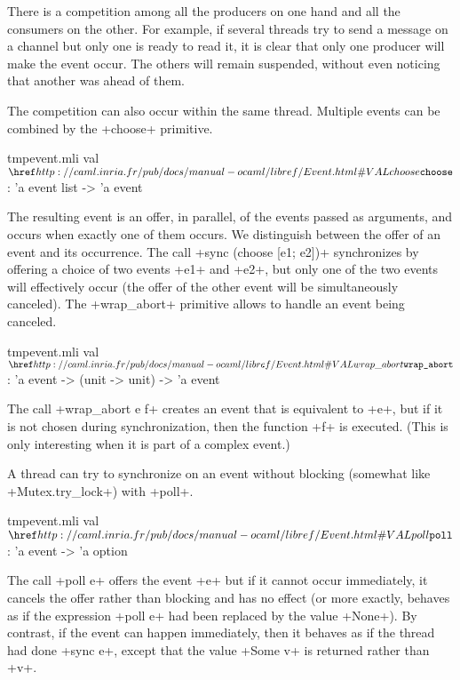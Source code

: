 There is a competition among all the producers on one hand and all the
consumers on the other.  For example, if several threads try to send a
message on a channel but only one is ready to read it, it is clear
that only one producer will make the event occur.  The others will
remain suspended, without even noticing that another was
 ahead of them.

The competition can also occur within the same thread.
Multiple events can be combined by the \ml+choose+ primitive.
%
\begin{listingcodefile}{tmpevent.mli}
val $\indexlibvalue{Event}{choose}$ : 'a event list -> 'a event
\end{listingcodefile}
%
The resulting event is an offer, in parallel, of the events passed as
arguments, and occurs when exactly one of them occurs.  We distinguish
between the offer of an event and its occurrence.  The call
\ml+sync (choose [e1; e2])+ synchronizes by offering a choice of two events
\ml+e1+ and \ml+e2+, but only one of the two events will effectively
occur (the offer of the other event will be simultaneously canceled).
The \ml+wrap_abort+ primitive allows to handle an event being
canceled.
%
\begin{listingcodefile}{tmpevent.mli}
val $\indexlibvalue{Event}{wrap\_abort}$ : 'a event -> (unit -> unit) -> 'a event
\end{listingcodefile}
%
The call \ml+wrap_abort e f+ creates an event that is equivalent to
\ml+e+, but if it is not chosen during synchronization, then the
function \ml+f+ is executed.  (This is only interesting when it is
part of a complex event.)

A thread can try to synchronize on an event without blocking (somewhat
like \ml+Mutex.try_lock+) with \ml+poll+.
%
\begin{listingcodefile}{tmpevent.mli}
val $\indexlibvalue{Event}{poll}$ : 'a event -> 'a option
\end{listingcodefile}
%
The call \ml+poll e+ offers the event \ml+e+ but if it cannot occur
immediately, it cancels the offer rather than blocking and has no
effect (or more exactly, behaves as if the expression \ml+poll e+ had
been replaced by the value \ml+None+).  By contrast, if the event can
happen immediately, then it behaves as if the thread had done
\ml+sync e+, except that the value \ml+Some v+ is returned
rather than \ml+v+.

